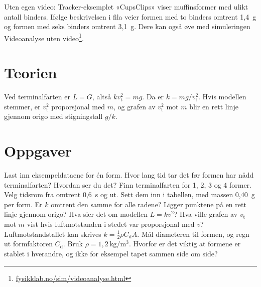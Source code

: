 \documentclass[11pt]{article}
\begin{document}
Uten egen video: Tracker-eksemplet «CupsClips» viser muffinsformer med ulikt antall binders. Ifølge beskrivelsen i fila veier formen med to binders omtrent 1,4~g og formen med seks binders omtrent 3,1~g. Dere kan også øve med simuleringen Videoanalyse uten video\footnote{\url{fysikklab.no/sim/videoanalyse.html}}.

\section*{Teorien}

Ved terminalfarten er $L = G$, altså $kv_{\mathrm{t}}^{2} = mg$. Da er $k = mg / v_{\mathrm{t}}^{2}$. Hvis modellen stemmer, er $v_{\mathrm{t}}^{2}$ proporsjonal med $m$, og grafen av $v_{\mathrm{t}}^{2}$ mot $m$ blir en rett linje gjennom origo med stigningstall $g/k$.

\section*{Oppgaver}

\begin{oppgaveliste}
\oppgave {}Last inn eksempeldataene for én form. Hvor lang tid tar det før formen har nådd terminalfarten? Hvordan ser du det?
\svar
\oppgave {}Finn terminalfarten for 1, 2, 3 og 4 former. Velg tidsrom fra omtrent 0,6~s og ut. Sett dem inn i tabellen, med massen 0,40~g per form.
\svar
\oppgave {}Er $k$ omtrent den samme for alle radene? Ligger punktene på en rett linje gjennom origo? Hva sier det om modellen $L = kv^{2}$?
\svar
\oppgave {}Hva ville grafen av $v_{\mathrm{t}}$ mot $m$ vist hvis luftmotstanden i stedet var proporsjonal med $v$?
\svar
\oppgave {}Luftmotstandstallet kan skrives $k = \tfrac{1}{2}ρC_{\mathrm{d}}A$. Mål diameteren til formen, og regn ut formfaktoren $C_{\mathrm{d}}$. Bruk $ρ = 1{,}2\,\mathrm{kg/m^{3}}$.
\svar
\oppgave {}Hvorfor er det viktig at formene er stablet i hverandre, og ikke for eksempel tapet sammen side om side?
\svar
\end{oppgaveliste}
\end{document}
